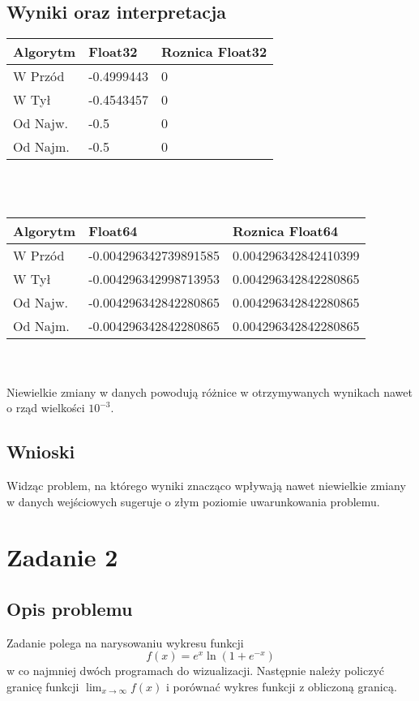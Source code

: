 \documentclass{article}
\begin{document}
\subsection{Wyniki oraz interpretacja}
\vspace{10pt}
\setlength{\tabcolsep}{2pt}
\renewcommand{\arraystretch}{1.4}
\begin{tabularx}{\linewidth}{|l|Y|X|}
\hline
Algorytm & Float32 & Roznica Float32 \\
\hline
W Przód & -0.4999443 & 0 \\
\hline
W Tył & -0.4543457 & 0 \\
\hline
Od Najw. & -0.5 & 0 \\
\hline
Od Najm. & -0.5 & 0 \\
\hline
\end{tabularx} \\
\vspace{25pt} \\
\setlength{\tabcolsep}{2pt}
\renewcommand{\arraystretch}{1.4}
\begin{tabularx}{\linewidth}{|l|Y|X|}
\hline
Algorytm & Float64 & Roznica Float64 \\
\hline
W Przód & -0.004296342739891585 & 0.004296342842410399 \\
\hline
W Tył & -0.004296342998713953 & 0.004296342842280865 \\
\hline
Od Najw. & -0.004296342842280865 & 0.004296342842280865 \\
\hline
Od Najm. & -0.004296342842280865 & 0.004296342842280865 \\
\hline
\end{tabularx} \\
\vspace{25pt} \\
Niewielkie zmiany w danych powodują różnice w otrzymywanych wynikach nawet o rząd wielkości $10^{-3}$.
\subsection{Wnioski}
Widząc problem, na którego wyniki znacząco wpływają nawet niewielkie zmiany w danych wejściowych sugeruje o złym poziomie uwarunkowania problemu.  
\vspace{20pt}
\section{Zadanie 2}
\subsection{Opis problemu}
Zadanie polega na narysowaniu wykresu funkcji 
$$f(x) = e^{x}\ln{(1 + e^{-x})}$$
w co najmniej dwóch programach do wizualizacji. Następnie należy policzyć granicę funkcji $\lim_{x \to \infty}f(x)$ i porównać wykres funkcji z obliczoną granicą.
\end{document}
